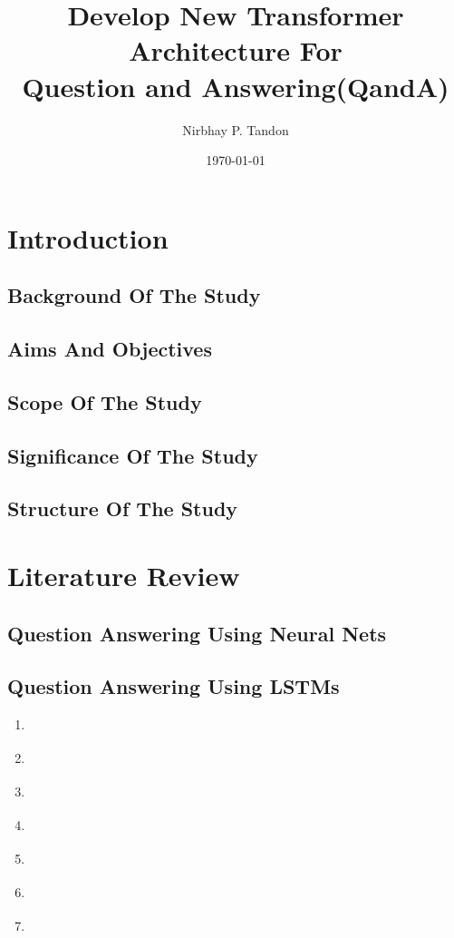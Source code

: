 \documentclass[12pt]{report}
\begin{document}
    \title{Develop New Transformer Architecture For \\ Question and Answering(QandA)}

    \author{Nirbhay P. Tandon}

    \date{\vfill \monthyeardate\today}
    \maketitle


    \newpage
    \newpage
    \tableofcontents
    \newpage
    \listoffigures
    \listoftables

    \chapter{\centering Introduction}\label{c1}
        \section{Background Of The Study}\label{11}
        \section{Aims And Objectives}\label{12}
        \section{Scope Of The Study}\label{13}
        \section{Significance Of The Study}\label{14}
        \section{Structure Of The Study}\label{15}
    \chapter{\centering Literature Review}\label{c2}
        \section{Question Answering Using Neural Nets}\label{21}
        \section{Question Answering Using LSTMs}\label{22}
        \begin{enumerate}
            \item \cite{lstm}
             \item   \cite{lstmoriginal}
            \item   \cite{schmid}
          \item  \cite{lstmhaighextractive}
           \item \cite{lstmhu2016question}
         \item   \cite{lstmintent}
         \item \cite{fastQA}

        \end{enumerate}
\end{document}
